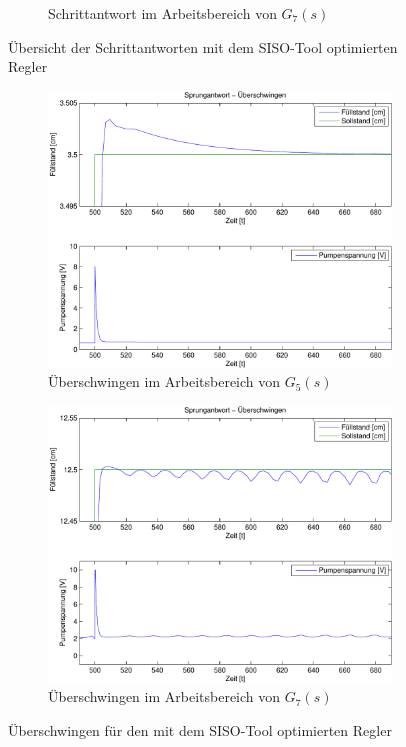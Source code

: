 \begin{figure}[h!]
\begin{subfigure}{0.475\textwidth}
		\caption{Schrittantwort im Arbeitsbereich von $G_7(s)$}
	\end{subfigure}
	\caption{Übersicht der Schrittantworten mit dem SISO-Tool optimierten Regler}
\end{figure}

\begin{figure}[h!]
	\begin{subfigure}{0.475\textwidth}
		\includegraphics[width=1\textwidth]{11/L5_step_overshoot_plot.pdf}
		\caption{Überschwingen im Arbeitsbereich von $G_5(s)$}
	\end{subfigure}
	\hfill{}
	\begin{subfigure}{0.475\textwidth}
		\includegraphics[width=1\textwidth]{11/L7_step_overshoot_plot.pdf}
		\caption{Überschwingen im Arbeitsbereich von $G_7(s)$}
	\end{subfigure}
	\caption{Überschwingen für den mit dem SISO-Tool optimierten Regler}
\end{figure}

